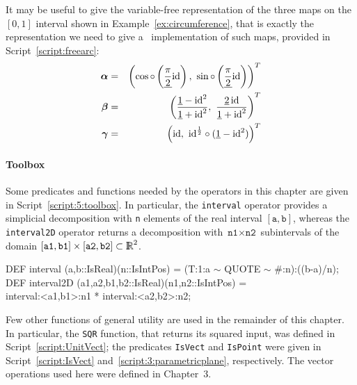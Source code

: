 \documentclass{31x47jw}
\begin{document}
\begin{example}
\label{ex:freearc}
    
It may be useful to give the variable-free representation of the three
maps on the $[0,1]$ interval shown in Example~\ref{ex:circumference},
that is exactly the representation we need to give a \pl\
implementation of such maps, provided in Script~\ref{script:freearc}:
\begin{eqnarray}
{\mbox{\boldmath $\alpha$}} &=& \left(\cos \circ \left( \underline{\pi \over 2} 
\textrm{id}\right), \
\sin \circ \left( \underline{\pi \over 2} \textrm{id} \right) \right)^T
\\
{\mbox{\boldmath $\beta$}} &=& \left(\frac{\underline{1} - 
\textrm{id}^2 }{ \underline{1}+ \textrm{id}^2}, \
{\underline{2} \,\textrm{id} \over \underline{1}+ \textrm{id}^2} 
\right)^T
\\
{\mbox{\boldmath $\gamma$}} &=& \left( \textrm{id}, \ \textrm{id}^{1\over 2}\circ 
(\underline{1}- \textrm{id}^2) \right)^T
\label{eq:5:alpha}
\end{eqnarray}

\end{example}


\paragraph{Toolbox}

Some predicates and functions needed by the operators in this
chapter are given in Script~\ref{script:5:toolbox}.  In particular,
the \texttt{interval} operator provides a simplicial decomposition with
\texttt{n} elements of the real interval $[\texttt{a},\texttt{b}]$,
whereas the \texttt{interval2D} operator returns a decomposition with
$\texttt{n1} \times \texttt{n2}$ subintervals of the domain
$[\texttt{a1},\texttt{b1}]\times
[\texttt{a2},\texttt{b2}]\subset\mathbb{I\!\!R}^{2}$.

\begin{script}[Toolbox] 
\begin{smallplasm} 
DEF interval (a,b::IsReal)(n::IsIntPos) = 
  (T:1:a  $\sim$  QUOTE  $\sim$  \#:n):((b-a)/n);\\
DEF interval2D (a1,a2,b1,b2::IsReal)(n1,n2::IsIntPos) = \+\\
  interval:<a1,b1>:n1 * interval:<a2,b2>:n2;
\end{smallplasm} 
\label{script:5:toolbox}
\end{script}
Few other functions of general utility are used in the remainder of
this chapter.  In particular, the \texttt{SQR} function, that returns
its squared input, was defined in Script~\ref{script:UnitVect};
the predicates \texttt{IsVect} and \texttt{IsPoint} were given in
Script~\ref{script:IsVect} and~\ref{script:3:parametricplane}, 
respectively.  The vector operations used here were
defined in Chapter~3.
\end{document}
